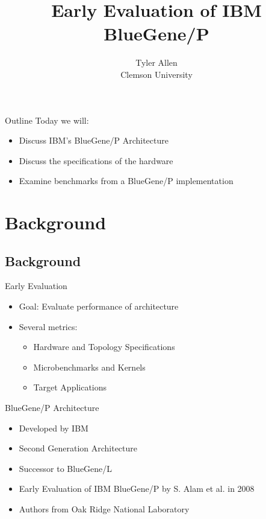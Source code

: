 \documentclass{beamer}
\title[]{Early Evaluation of IBM BlueGene/P}
\author[]{Tyler Allen\\ \footnotesize Clemson University}
\begin{document}
\begin{frame}
\begin{center}
\maketitle
\end{center}
\end{frame}

\begin{frame}{Outline}
Today we will:
\begin{itemize}
\item Discuss IBM's BlueGene/P Architecture
\item Discuss the specifications of the hardware
\item Examine benchmarks from a BlueGene/P implementation
\end{itemize}
\end{frame}

\section{Background}
\subsection{Background}
\begin{frame}{Early Evaluation}
\begin{itemize}
\item Goal: Evaluate performance of architecture
\item Several metrics:
\begin{itemize}
\item Hardware and Topology Specifications
\item Microbenchmarks and Kernels
\item Target Applications
\end{itemize}
\end{itemize}
\end{frame}

\begin{frame}{BlueGene/P Architecture}
\begin{itemize}
\item Developed by IBM
\item Second Generation Architecture
\item Successor to BlueGene/L
\item Early Evaluation of IBM BlueGene/P by S. Alam et al. in 2008
\item Authors from Oak Ridge National Laboratory
\end{itemize}
\end{frame}
\end{document}
